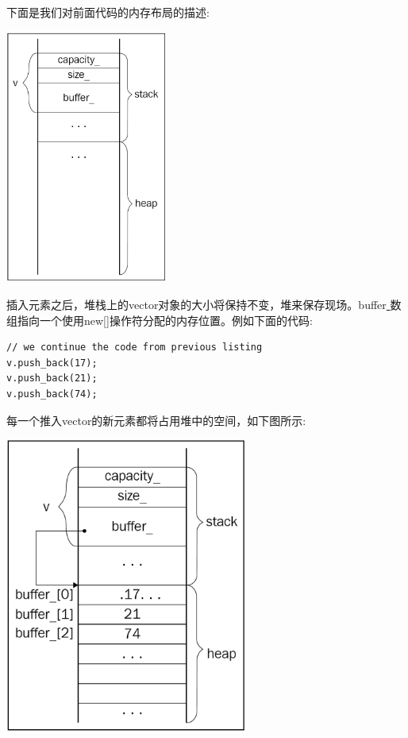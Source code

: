 下面是我们对前面代码的内存布局的描述: \par

\begin{center}
	\includegraphics[width=0.4\textwidth]{content/Section-2/Chapter-6/9}
\end{center}

插入元素之后，堆栈上的vector对象的大小将保持不变，堆来保存现场。buffer\underline{ }数组指向一个使用new[]操作符分配的内存位置。例如下面的代码: \par

\begin{lstlisting}[caption={}]
// we continue the code from previous listing
v.push_back(17);
v.push_back(21);
v.push_back(74);
\end{lstlisting}

每一个推入vector的新元素都将占用堆中的空间，如下图所示: \par

\begin{center}
	\includegraphics[width=0.6\textwidth]{content/Section-2/Chapter-6/10}
\end{center}

